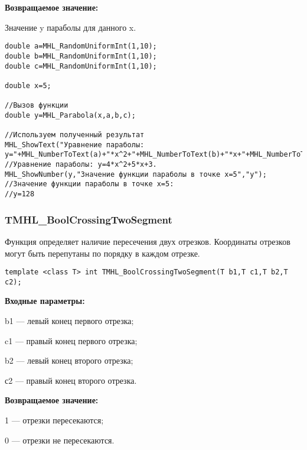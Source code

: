 \documentclass[a4paper,12pt]{article}
\begin{document}
\textbf{Возвращаемое значение:}

Значение y параболы для данного x.


\begin{lstlisting}[label=code_use_MHL_Parabola,caption=Пример использования]
double a=MHL_RandomUniformInt(1,10);
double b=MHL_RandomUniformInt(1,10);
double c=MHL_RandomUniformInt(1,10);

double x=5;

//Вызов функции
double y=MHL_Parabola(x,a,b,c);

//Используем полученный результат
MHL_ShowText("Уравнение параболы: y="+MHL_NumberToText(a)+"*x^2+"+MHL_NumberToText(b)+"*x+"+MHL_NumberToText(c));
//Уравнение параболы: y=4*x^2+5*x+3.
MHL_ShowNumber(y,"Значение функции параболы в точке x=5","y");
//Значение функции параболы в точке x=5:
//y=128
\end{lstlisting}

\subsubsection{TMHL\_BoolCrossingTwoSegment}\label{TMHL_BoolCrossingTwoSegment}

Функция определяет наличие пересечения двух отрезков. Координаты отрезков могут быть перепутаны по порядку в каждом отрезке.


\begin{lstlisting}[label=code_syntax_TMHL_BoolCrossingTwoSegment,caption=Синтаксис]
template <class T> int TMHL_BoolCrossingTwoSegment(T b1,T c1,T b2,T c2);
\end{lstlisting}

\textbf{Входные параметры:}  
 
b1 --- левый конец первого отрезка;
 
c1 --- правый конец первого отрезка;
 
b2 --- левый конец второго отрезка;
 
с2 --- правый конец второго отрезка.

\textbf{Возвращаемое значение:}
 
1 --- отрезки пересекаются;
 
0 --- отрезки не пересекаются.
\end{document}
